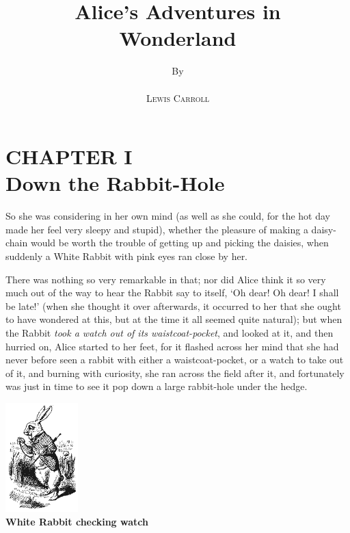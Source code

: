 \documentclass{article}
\title{\textbf{Alice's Adventures in \\ Wonderland}}
\author{By \\ \\ \textsc{Lewis Carroll}}
\date{}
\begin{document}
\maketitle

\section*{CHAPTER I \\ Down the Rabbit-Hole}


So she was considering in her own mind (as well as she could, for the hot day made her feel very sleepy and stupid), whether the pleasure of making a daisy-chain would be worth the trouble of getting up and picking the daisies, when suddenly a White Rabbit with pink eyes ran close by her.

There was nothing so very remarkable in that; nor did Alice think it so very much out of the way to hear the Rabbit say to itself, `Oh dear! Oh dear! I shall be late!' (when she thought it over afterwards, it occurred to her that she ought to have wondered at this, but at the time it all seemed quite natural); but when the Rabbit \textit{took a watch out of its waistcoat-pocket}, and looked at it, and then hurried on, Alice started to her feet, for it flashed across her mind that she had never before seen a rabbit with either a waistcoat-pocket, or a watch to take out of it, and burning with curiosity, she ran across the field after it, and fortunately was just in time to see it pop down a large rabbit-hole under the hedge.

\begin{center}
    \includegraphics{RabbitWatch}\\
    \textbf{White Rabbit checking watch}
\end{center}
\end{document}
